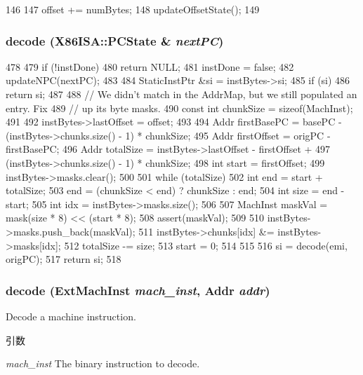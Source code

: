 \begin{DoxyCode}
146     {
147         offset += numBytes;
148         updateOffsetState();
149     }
\end{DoxyCode}
\hypertarget{classX86ISA_1_1Decoder_a2aa7b25617e9f15447ee6e934f4a3529}{
\subsubsection[{decode}]{ decode ({\bf X86ISA::PCState} \& {\em nextPC})}}
\label{classX86ISA_1_1Decoder_a2aa7b25617e9f15447ee6e934f4a3529}



\begin{DoxyCode}
478 {
479     if (!instDone)
480         return NULL;
481     instDone = false;
482     updateNPC(nextPC);
483 
484     StaticInstPtr &si = instBytes->si;
485     if (si)
486         return si;
487 
488     // We didn't match in the AddrMap, but we still populated an entry. Fix
489     // up its byte masks.
490     const int chunkSize = sizeof(MachInst);
491 
492     instBytes->lastOffset = offset;
493 
494     Addr firstBasePC = basePC - (instBytes->chunks.size() - 1) * chunkSize;
495     Addr firstOffset = origPC - firstBasePC;
496     Addr totalSize = instBytes->lastOffset - firstOffset +
497         (instBytes->chunks.size() - 1) * chunkSize;
498     int start = firstOffset;
499     instBytes->masks.clear();
500 
501     while (totalSize) {
502         int end = start + totalSize;
503         end = (chunkSize < end) ? chunkSize : end;
504         int size = end - start;
505         int idx = instBytes->masks.size();
506 
507         MachInst maskVal = mask(size * 8) << (start * 8);
508         assert(maskVal);
509 
510         instBytes->masks.push_back(maskVal);
511         instBytes->chunks[idx] &= instBytes->masks[idx];
512         totalSize -= size;
513         start = 0;
514     }
515 
516     si = decode(emi, origPC);
517     return si;
518 }
\end{DoxyCode}
\hypertarget{classX86ISA_1_1Decoder_a4ed948f8d08575cc2916fe32154ea69d}{
\subsubsection[{decode}]{ decode ({\bf ExtMachInst} {\em mach\_\-inst}, \/  {\bf Addr} {\em addr})}}
\label{classX86ISA_1_1Decoder_a4ed948f8d08575cc2916fe32154ea69d}
Decode a machine instruction. 
\begin{DoxyParams}{引数}
\item[{\em mach\_\-inst}]The binary instruction to decode. \end{DoxyParams}

